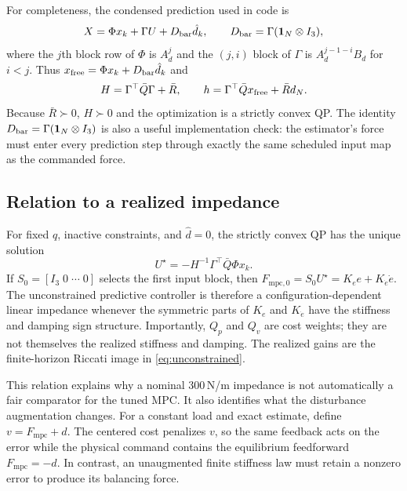 \documentclass[conference]{IEEEtran}
\newcommand{\dhat}{\hat d}
\begin{document}
For completeness, the condensed prediction used in code is
\begin{equation}
X=\Phi x_k+\Gamma U+D_{\rm bar}\dhat_k,\qquad
D_{\rm bar}=\Gamma(\bm 1_N\otimes I_3),
\label{eq:lifted}
\end{equation}
where the $j$th block row of $\Phi$ is $A_d^j$ and the $(j,i)$ block of
$\Gamma$ is $A_d^{j-1-i}B_d$ for $i<j$. Thus
$x_{\rm free}=\Phi x_k+D_{\rm bar}\dhat_k$ and
\begin{equation}
H=\Gamma^\top\bar Q\Gamma+\bar R,\qquad
h=\Gamma^\top\bar Qx_{\rm free}+\bar R d_N.
\label{eq:condensed}
\end{equation}
Because $\bar R\succ0$, $H\succ0$ and the optimization is a strictly convex
QP. The identity $D_{\rm bar}=\Gamma(\bm 1_N\otimes I_3)$ is also a useful
implementation check: the estimator's force must enter every prediction step
through exactly the same scheduled input map as the commanded force.

\subsection{Relation to a realized impedance}

For fixed $q$, inactive constraints, and $\dhat=0$, the strictly convex QP has
the unique solution
\begin{equation}
U^\star=-H^{-1}\Gamma^\top\bar Q\Phi x_k.
\label{eq:unconstrained}
\end{equation}
If $S_0=[I_3\;0\;\cdots\;0]$ selects the first input block, then
$F_{\mathrm{mpc},0}=S_0U^\star=K_e e+K_{\dot e}\dot e$. The unconstrained
predictive controller is therefore a configuration-dependent linear
impedance whenever the symmetric parts of $K_e$ and $K_{\dot e}$ have the
stiffness and damping sign structure. Importantly, $Q_p$ and $Q_v$ are cost
weights; they are not themselves the realized stiffness and damping. The
realized gains are the finite-horizon Riccati image in
\eqref{eq:unconstrained}.

This relation explains why a nominal 300\,N/m impedance is not automatically a
fair comparator for the tuned MPC. It also identifies what the disturbance
augmentation changes. For a constant load and exact estimate, define
$v=F_{\mathrm{mpc}}+d$. The centered cost penalizes $v$, so the same feedback
acts on the error while the physical command contains the equilibrium
feedforward $F_{\mathrm{mpc}}=-d$. In contrast, an unaugmented finite
stiffness law must retain a nonzero error to produce its balancing force.
\end{document}
